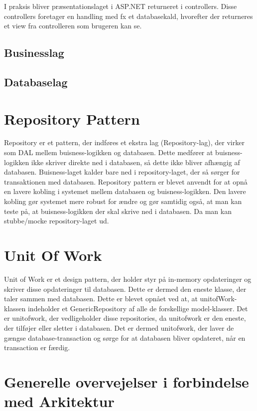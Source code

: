 I  praksis bliver  præsentationslaget i ASP.NET returneret i controllers. Disse controllers foretager en handling med fx et databasekald, hvorefter der returneres et view fra controlleren som brugeren kan se.
\subsection{Businesslag}

\subsection{Databaselag}

\section{Repository Pattern}
Repository er et pattern, der indføres et ekstra lag (Repository-lag), der virker som DAL mellem buisness-logikken og databasen. Dette medfører at buisness-logikken ikke skriver direkte ned i databasen, så dette ikke bliver afhængig af databasen. Buisness-laget kalder bare ned i repository-laget, der så sørger for transaktionen med databasen. 
Repository pattern er blevet anvendt for at opnå en lavere kobling i systemet mellem databasen og buisness-logikken. Den lavere kobling gør systemet mere robust for ændre og gør samtidig også, at man kan teste på, at buisness-logikken der skal skrive ned i databasen. Da man kan stubbe/mocke repository-laget ud.

\section{Unit Of Work}
Unit of Work er et design pattern, der holder styr på in-memory opdateringer og skriver disse opdateringer til databasen. Dette er dermed den eneste klasse, der taler sammen med databasen.
Dette er blevet opnået ved at, at unitofWork-klassen indeholder et GenericRepository af alle de forskellige model-klasser. Det er unitofwork, der vedligeholder disse repositories, da unitofwork er den eneste, der tilføjer eller sletter i databasen. Det er dermed unitofwork, der laver de gængse database-transaction og sørge for at databasen bliver opdateret, når en transaction er færdig.


\section{Generelle overvejelser i forbindelse med Arkitektur}